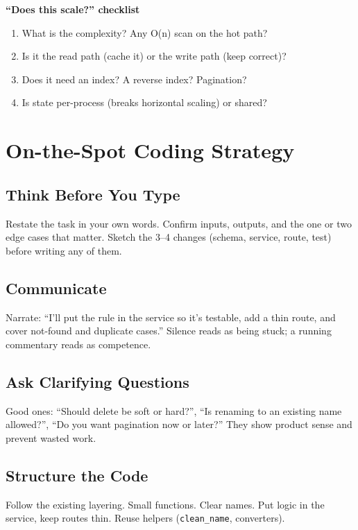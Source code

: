 \documentclass[11pt,a4paper]{report}
\begin{document}
\textbf{``Does this scale?'' checklist}
\begin{enumerate}[leftmargin=1.5em]
  \item What is the complexity? Any O(n) scan on the hot path?
  \item Is it the read path (cache it) or the write path (keep correct)?
  \item Does it need an index? A reverse index? Pagination?
  \item Is state per-process (breaks horizontal scaling) or shared?
\end{enumerate}

\chapter{On-the-Spot Coding Strategy}

\section{Think Before You Type}
Restate the task in your own words. Confirm inputs, outputs, and the one or two
edge cases that matter. Sketch the 3--4 changes (schema, service, route, test)
before writing any of them.

\section{Communicate}
Narrate: ``I'll put the rule in the service so it's testable, add a thin route,
and cover not-found and duplicate cases.'' Silence reads as being stuck; a
running commentary reads as competence.

\section{Ask Clarifying Questions}
Good ones: ``Should delete be soft or hard?'', ``Is renaming to an existing name
allowed?'', ``Do you want pagination now or later?'' They show product sense and
prevent wasted work.

\section{Structure the Code}
Follow the existing layering. Small functions. Clear names. Put logic in the
service, keep routes thin. Reuse helpers (\texttt{clean\_name}, converters).
\end{document}
